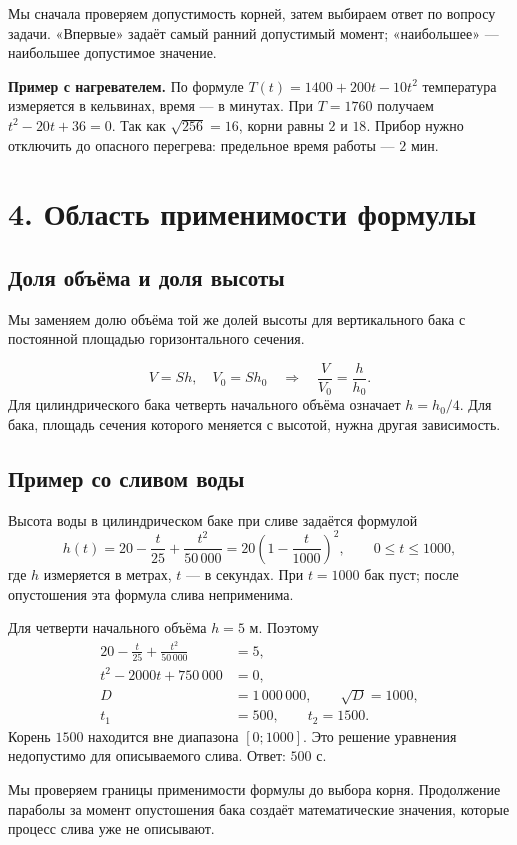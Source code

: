 \documentclass[a4paper,12pt]{article}
\newcommand{\heading}[1]{\section*{\color{darkaccent}#1}}
\newcommand{\subheading}[1]{\subsection*{\color{darkaccent}#1}}
\newcommand{\checkitem}[1]{\par\noindent\makebox[6mm][l]{$\square$}\begin{minipage}[t]{\dimexpr\linewidth-6mm\relax}\raggedright #1\end{minipage}\par}
\begin{document}
\checkitem{Мы сначала проверяем допустимость корней, затем выбираем ответ по вопросу задачи. «Впервые» задаёт самый ранний допустимый момент; «наибольшее» --- наибольшее допустимое значение.}

\textbf{Пример с нагревателем.} По формуле $T(t)=1400+200t-10t^2$ температура измеряется в кельвинах, время --- в минутах. При $T=1760$ получаем $t^2-20t+36=0$. Так как $\sqrt{256}=16$, корни равны $2$ и $18$. Прибор нужно отключить до опасного перегрева: предельное время работы --- $2$ мин.

\clearpage
\heading{4. Область применимости формулы}
\subheading{Доля объёма и доля высоты}
\checkitem{Мы заменяем долю объёма той же долей высоты для вертикального бака с постоянной площадью горизонтального сечения.}
\[
V=Sh,\quad V_0=Sh_0
\quad\Longrightarrow\quad
\frac{V}{V_0}=\frac{h}{h_0}.
\]
Для цилиндрического бака четверть начального объёма означает $h=h_0/4$. Для бака, площадь сечения которого меняется с высотой, нужна другая зависимость.

\subheading{Пример со сливом воды}
Высота воды в цилиндрическом баке при сливе задаётся формулой
\[
h(t)=20-\frac{t}{25}+\frac{t^2}{50\,000}
=20\left(1-\frac{t}{1000}\right)^2,
\qquad 0\le t\le1000,
\]
где $h$ измеряется в метрах, $t$ --- в секундах. При $t=1000$ бак пуст; после опустошения эта формула слива неприменима.

Для четверти начального объёма $h=5$ м. Поэтому
\begin{align*}
20-\frac{t}{25}+\frac{t^2}{50\,000}&=5,\\
t^2-2000t+750\,000&=0,\\
D&=1\,000\,000,\qquad \sqrt D=1000,\\
t_1&=500,\qquad t_2=1500.
\end{align*}
Корень $1500$ находится вне диапазона $[0;1000]$. Это решение уравнения недопустимо для описываемого слива. Ответ: $500$ с.

\checkitem{Мы проверяем границы применимости формулы до выбора корня. Продолжение параболы за момент опустошения бака создаёт математические значения, которые процесс слива уже не описывают.}
\end{document}
